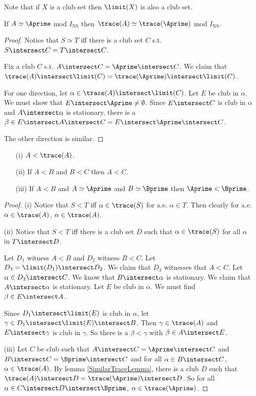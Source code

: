 \documentclass[oneside,12pt]{amsart}
\begin{document}
Note that if $X$ is a club set then $\limit(X)$ is also a club set.

\begin{lemma}
\label{SimilarTraceLemma}
If $A\simeq \Aprime$ mod $I_{\text{NS}}$ then
$\trace(A) \simeq \trace(\Aprime)$ mod $I_{\text{NS}}$.
\end{lemma}
\begin{proof}
Notice that $S\simeq T$ iff there is a club set $C$ s.t. $S\intersect C = T\intersect C$.

Fix a club $C$ s.t. $A\intersect C = \Aprime\intersect C$.
We claim that $\trace(A) \intersect \limit(C) = \trace(\Aprime) \intersect \limit(C)$.

For one direction, let $\alpha\in\trace(A)\intersect \limit(C)$. Let $E$ be club in $\alpha$.
We must show that $E\intersect \Aprime \not= \emptyset$. Since $E\intersect C$
is club in $\alpha$ and $A\intersect\alpha$ is stationary,
there is a $\beta\in  E \intersect A\intersect C =  E \intersect \Aprime\intersect C$.

The other direction is similar.

\end{proof}

\begin{lemma}
\mbox{}
\begin{enumerate}
\item[(i)] $A<\trace(A)$.
\item[(ii)] If $A<B$ and $B<C$ then $A<C$.
\item[(iii)] If $A<B$ and $A\simeq \Aprime$ and $B\simeq \Bprime$ then
$\Aprime<\Bprime$.
\end{enumerate}
\end{lemma}
\begin{proof}
(i) Notice that $S<T$ iff $\alpha\in\trace(S)$ for a.e. $\alpha \in T$. Then clearly for a.e.
$\alpha\in\trace(A)$, $\alpha\in\trace(A)$.

(ii) Notice that $S<T$ iff there is a club set $D$ such that $\alpha\in\trace(S)$ for all
$\alpha$ in $T\intersect D$.

Let $D_1$ witness $A<B$ and $D_2$ witness $B < C$.
Let $D_3=\limit(D_1) \intersect D_2$.
We claim that $D_3$ witnesses that $A<C$. Let $\alpha\in D_3 \intersect C$. We know
that $B\intersect \alpha$ is stationary. We claim that
$A\intersect \alpha$ is stationary. Let $E$ be club in $\alpha$. We must find
$\beta\in E\intersect A$.

Since $D_1 \intersect\limit(E)$ is club in $\alpha$, let
$\gamma\in D_1 \intersect \limit(E) \intersect B$.
Then $\gamma\in\trace(A)$ and $E\intersect\gamma$ is club in $\gamma$. So there
is a $\beta<\gamma$ with $\beta\in A\intersect E$.

(iii) Let $C$ be club such that $A\intersect C=\Aprime\intersect C$ and
$B\intersect C = \Bprime\intersect C$ and for all $\alpha\in B\intersect C$,
$\alpha\in\trace(A)$. By lemma \ref{SimilarTraceLemma}, there is a club $D$ such that
$\trace(A)\intersect D = \trace(\Aprime) \intersect D$. So for all
$\alpha \in C \intersect D \intersect \Bprime$, $\alpha\in\trace(\Aprime)$.

\end{proof}
\end{document}

